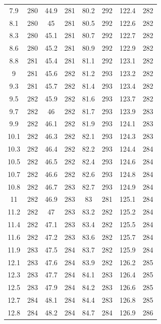 \documentclass[12pt]{ctexart}
\numberwithin{equation}{section}
\begin{document}
\begin{longtable}{cc|cc|cc|cc}
7.9  &  280  &  44.9  &  281  &  80.2  &  292  &  122.4  &  282  \\
8.1  &  280  &  45  &  281  &  80.5  &  292  &  122.6  &  282  \\
8.3  &  280  &  45.1  &  281  &  80.7  &  292  &  122.7  &  282  \\
8.6  &  280  &  45.2  &  281  &  80.9  &  292  &  122.9  &  282  \\
8.8  &  281  &  45.4  &  281  &  81.1  &  292  &  123.1  &  282  \\
9  &  281  &  45.6  &  282  &  81.2  &  293  &  123.2  &  282  \\
9.3  &  281  &  45.7  &  282  &  81.4  &  293  &  123.4  &  282  \\
9.5  &  282  &  45.9  &  282  &  81.6  &  293  &  123.7  &  282  \\
9.7  &  282  &  46  &  282  &  81.7  &  293  &  123.9  &  283  \\
9.9  &  282  &  46.1  &  282  &  81.9  &  293  &  124.1  &  283  \\
10.1  &  282  &  46.3  &  282  &  82.1  &  293  &  124.3  &  283  \\
10.3  &  282  &  46.4  &  282  &  82.2  &  293  &  124.4  &  284  \\
10.5  &  282  &  46.5  &  282  &  82.4  &  293  &  124.6  &  284  \\
10.7  &  282  &  46.6  &  282  &  82.6  &  293  &  124.8  &  284  \\
10.8  &  282  &  46.7  &  283  &  82.7  &  293  &  124.9  &  284  \\
11  &  282  &  46.9  &  283  &  83  &  281  &  125.1  &  284  \\
11.2  &  282  &  47  &  283  &  83.2  &  282  &  125.2  &  284  \\
11.4  &  282  &  47.1  &  283  &  83.4  &  282  &  125.5  &  284  \\
11.6  &  282  &  47.2  &  283  &  83.6  &  282  &  125.7  &  284  \\
11.9  &  283  &  47.5  &  284  &  83.7  &  282  &  125.9  &  284  \\
12.1  &  283  &  47.6  &  284  &  83.9  &  282  &  126.2  &  285  \\
12.3  &  283  &  47.7  &  284  &  84.1  &  283  &  126.4  &  285  \\
12.5  &  283  &  47.9  &  284  &  84.2  &  283  &  126.6  &  285  \\
12.7  &  284  &  48.1  &  284  &  84.4  &  283  &  126.8  &  285  \\
12.8  &  284  &  48.2  &  284  &  84.7  &  284  &  126.9  &  286  \\

\end{longtable}
\end{document}
